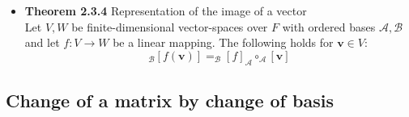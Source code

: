 \documentclass[11pt,a4paper]{article}
\begin{document}
\begin{itemize}
    \item \textbf{Theorem 2.3.4} Representation of the image of a vector \\
        Let $V,W$ be finite-dimensional vector-spaces over $F$ with ordered bases $\mathcal{A,B}$
        and let $f : V \to W$ be a linear mapping.
        The following holds for $\textbf{v} \in V$:
        \[
            _\mathcal{B}{[f(\textbf{v})]} = _\mathcal{B}{[f]}_\mathcal{A} \circ
            _\mathcal{A}[\textbf{v}]
        \]

\end{itemize}

\subsection{Change of a matrix by change of basis}
\end{document}
